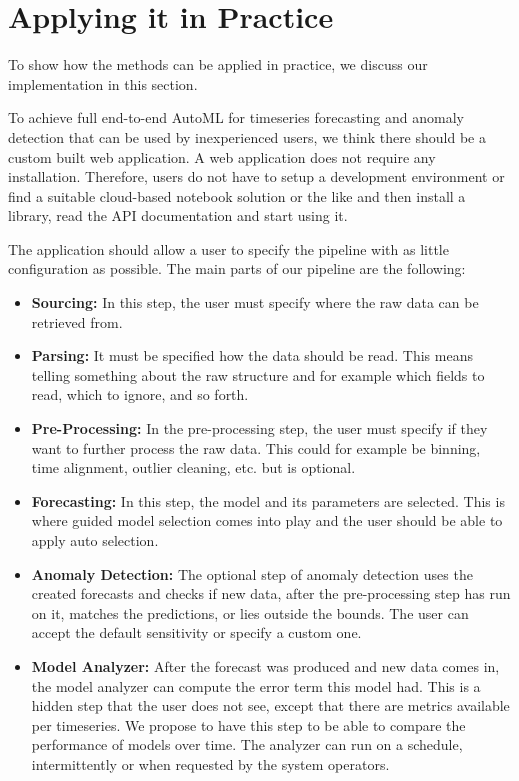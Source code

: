\section{Applying it in Practice}

To show how the methods can be applied in practice, we discuss our implementation in this section.

To achieve full end-to-end AutoML for timeseries forecasting and anomaly detection that can be used by inexperienced users, we think there should be a custom built web application. A web application does not require any installation. Therefore, users do not have to setup a development environment or find a suitable cloud-based notebook solution or the like and then install a library, read the API documentation and start using it.

\newpage
The application should allow a user to specify the pipeline with as little configuration as possible. The main parts of our pipeline are the following:


\begin{itemize}
    \item \textbf{Sourcing:} In this step, the user must specify where the raw data can be retrieved from. 
    \item \textbf{Parsing:} It must be specified how the data should be read. This means telling something about the raw structure and for example which fields to read, which to ignore, and so forth.
    \item \textbf{Pre-Processing:} In the pre-processing step, the user must specify if they want to further process the raw data. This could for example be binning, time alignment, outlier cleaning, etc. but is optional.
    \item \textbf{Forecasting:} In this step, the model and its parameters are selected. This is where guided model selection comes into play and the user should be able to apply auto selection.
    \item \textbf{Anomaly Detection:} The optional step of anomaly detection uses the created forecasts and checks if new data, after the pre-processing step has run on it, matches the predictions, or lies outside the bounds. The user can accept the default sensitivity or specify a custom one.
    \item \textbf{Model Analyzer:} After the forecast was produced and new data comes in, the model analyzer can compute the error term this model had. This is a hidden step that the user does not see, except that there are metrics available per timeseries. We propose to have this step to be able to compare the performance of models over time. The analyzer can run on a schedule, intermittently or when requested by the system operators.
\end{itemize}

